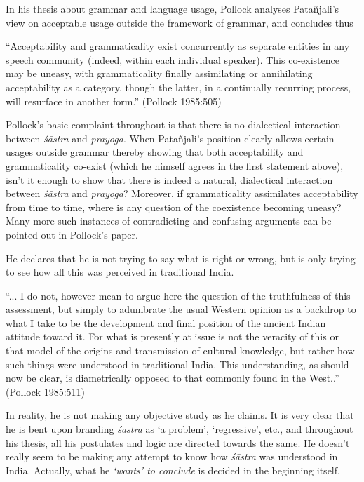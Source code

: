In his thesis about grammar and language usage, Pollock analyses Patañjali’s view on acceptable usage outside the framework of grammar, and concludes thus
\begin{myquote}
``Acceptability and grammaticality exist concurrently as separate entities in any speech community (indeed, within each individual speaker). This co-existence may be uneasy, with grammaticality finally assimilating or annihilating acceptability as a category, though the latter, in a continually recurring process, will resurface in another form.'' (Pollock 1985:505)
\end{myquote}

Pollock's basic complaint throughout is that there is no dialectical interaction between {\sl śāstra} and {\sl prayoga}. When Patañjali’s position clearly allows certain usages outside grammar thereby showing that both acceptability and grammaticality co-exist (which he himself agrees in the first statement above), isn't it enough to show that there is indeed a natural, dialectical interaction between {\sl śāstra} and {\sl prayoga}? Moreover, if grammaticality assimilates acceptability from time to time, where is any question of the coexistence becoming uneasy? Many more such instances of contradicting and confusing arguments can be pointed out in Pollock's paper.

He declares that he is not trying to say what is right or wrong, but is only trying to see how all this was perceived in traditional India. 
\begin{myquote}
``... I do not, however mean to argue here the question of the truthfulness of this assessment, but simply to adumbrate the usual Western opinion as a backdrop to what I take to be the development and final position of the ancient Indian attitude toward it. For what is presently at issue is not the veracity of this or that model of the origins and transmission of cultural knowledge, but rather how such things were understood in traditional India. This understanding, as should now be clear, is diametrically opposed to that commonly found in the West..'' (Pollock 1985:511)
\end{myquote}

In reality, he is not making any objective study as he claims. It is very clear that he is bent upon branding {\sl śāstra} as `a problem', `regressive', etc., and throughout his thesis, all his postulates and logic are directed towards the same. He doesn't really seem to be making any attempt to know how {\sl śāstra} was understood in India. Actually, what he {\sl `wants' to conclude} is decided in the beginning itself. 

